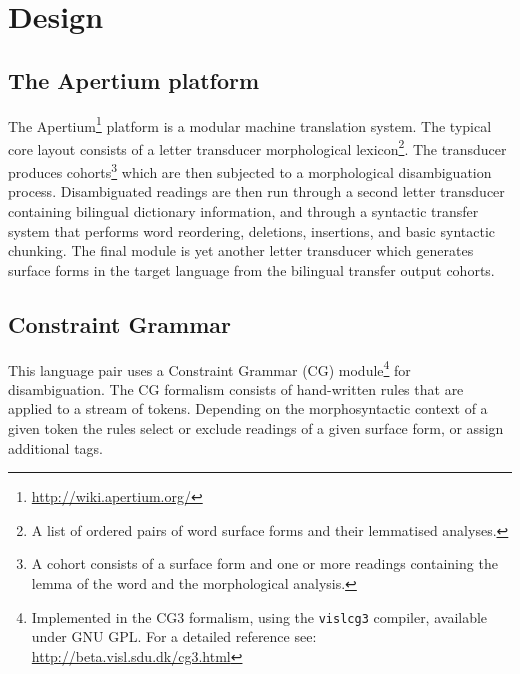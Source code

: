 \section{Design}
\subsection{The Apertium platform}
\nocite{forcada2011apertium}
The Apertium\footnote{\url{http://wiki.apertium.org/}} platform is a
modular machine translation system. The typical core layout consists
of a letter transducer morphological lexicon\footnote{A list of
ordered pairs of word surface forms and their lemmatised
analyses.}. The transducer produces cohorts\footnote{A cohort 
consists of a surface form and one or more readings containing the lemma of the 
word and the morphological analysis.} which are then subjected to a
morphological disambiguation process.
%
Disambiguated readings are then run through a second letter transducer
containing bilingual dictionary information, and through a
syntactic transfer system that performs word reordering, deletions,
insertions, and basic syntactic chunking.
%
The final module is yet another letter transducer which generates
surface forms in the target language from the bilingual transfer
output cohorts.

\subsection{Constraint Grammar}
This language pair uses a Constraint Grammar (CG)
module\footnote{Implemented in the CG3 formalism, using the
  \texttt{vislcg3} compiler, available under GNU GPL. For a detailed
  reference see: \url{http://beta.visl.sdu.dk/cg3.html}} for
disambiguation. The CG formalism consists of hand-written rules that
are applied to a stream of tokens. Depending on the morphosyntactic
context of a given token the rules select or exclude readings of a
given surface form, or assign additional tags.
